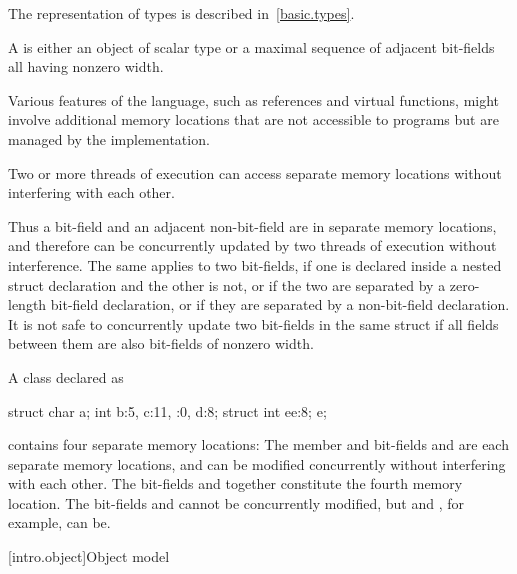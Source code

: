 \pnum
\begin{note} The representation of types is described
in~\ref{basic.types}. \end{note}

\pnum
A  is either an object of scalar type or a maximal
sequence of adjacent bit-fields all having nonzero width. \begin{note} Various
features of the language, such as references and virtual functions, might
involve additional memory locations that are not accessible to programs but are
managed by the implementation. \end{note} Two or more threads of
execution can access separate memory
locations without interfering with each other.

\pnum
\begin{note} Thus a bit-field and an adjacent non-bit-field are in separate memory
locations, and therefore can be concurrently updated by two threads of execution
without interference. The same applies to two bit-fields, if one is declared
inside a nested struct declaration and the other is not, or if the two are
separated by a zero-length bit-field declaration, or if they are separated by a
non-bit-field declaration. It is not safe to concurrently update two bit-fields
in the same struct if all fields between them are also bit-fields of nonzero
width. \end{note}

\pnum
\begin{example} A class declared as

\begin{codeblock}
struct {
  char a;
  int b:5,
  c:11,
  :0,
  d:8;
  struct {int ee:8;} e;
}
\end{codeblock}

contains four separate memory locations: The member  and bit-fields
 and  are each separate memory locations, and can be
modified concurrently without interfering with each other. The bit-fields
 and  together constitute the fourth memory location. The
bit-fields  and  cannot be concurrently modified, but
 and , for example, can be. \end{example}%

[intro.object]{Object model}

